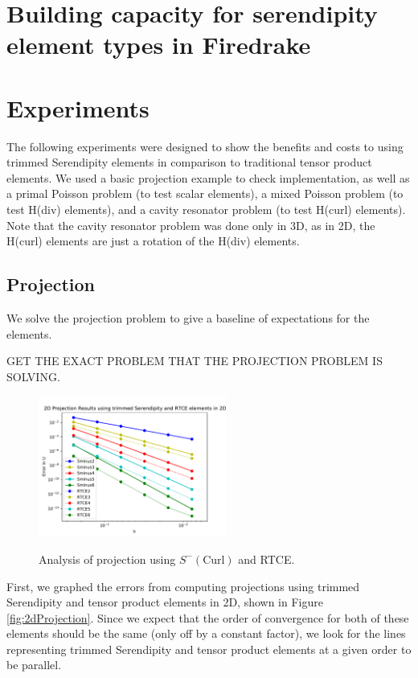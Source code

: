 \documentclass[manuscript,screen]{acmart}
\begin{document}
  \section{Building capacity for serendipity element types in Firedrake}

  \section{Experiments}
    
   The following experiments were designed to show the benefits and costs to using trimmed Serendipity elements in comparison to traditional tensor product elements.  We used a basic projection example to check implementation, as well as a primal Poisson problem (to test scalar elements), a mixed Poisson problem (to test H(div) elements), and a cavity resonator problem (to test H(curl) elements).  Note that the cavity resonator problem was done only in 3D, as in 2D, the H(curl) elements are just a rotation of the H(div) elements. 

\newpage
  \subsection{Projection}
  
  We solve the projection problem to give a baseline of expectations for the elements.  
  
  GET THE EXACT PROBLEM THAT THE PROJECTION PROBLEM IS SOLVING.

  \begin{figure}[h!]
    \caption{Analysis of projection using $S^-(\text{Curl})$ and RTCE.}
    \includegraphics[width=0.55\textwidth]{2dProjectionH.pdf}
    \label{fig:2dProjectionH}
  \end{figure}
  
  \noindent First, we graphed the errors from computing projections using trimmed Serendipity and tensor product elements in 2D, shown in Figure \ref{fig:2dProjection}.  Since we expect that the order of convergence for both of these elements should be the same (only off by a constant factor), we look for the lines representing trimmed Serendipity and tensor product elements at a given order to be parallel.
\end{document}
